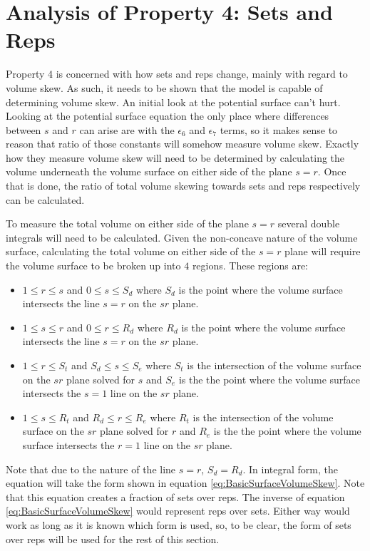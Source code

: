 \section{Analysis of Property 4: Sets and Reps}
\label{sec:PotentialSurfaceAnalysisOfProperty4}

Property 4 is concerned with how sets and reps change, mainly with regard to volume skew. As such, it needs to be shown that the model is capable of determining volume skew. An initial look at the potential surface can't hurt. Looking at the potential surface equation the only place where differences between $s$ and $r$ can arise are with the $\epsilon_6$ and $\epsilon_7$ terms, so it makes sense to reason that ratio of those constants will somehow measure volume skew. Exactly how they measure volume skew will need to be determined by calculating the volume underneath the volume surface on either side of the plane $s=r$. Once that is done, the ratio of total volume skewing towards sets and reps respectively can be calculated. 

To measure the total volume on either side of the plane $s=r$ several double integrals will need to be calculated. Given the non-concave nature of the volume surface, calculating the total volume on either side of the $s=r$ plane will require the volume surface to be broken up into $4$ regions. These regions are:

\begin{itemize}
	\item $1\le r\le s$ and $0\le s \le S_d$ where $S_d$ is the point where the volume surface intersects the line $s=r$ on the $sr$ plane.
	\item $1\le s\le r$ and $0\le r \le R_d$ where $R_d$ is the point where the volume surface intersects the line $s=r$ on the $sr$ plane.
	\item $1\le r\le S_t$ and $S_d \le s\le S_e$ where $S_t$ is the intersection of the volume surface on the $sr$ plane solved for $s$ and $S_e$ is the the point where the volume surface intersects the $s=1$ line on the $sr$ plane.
	\item $1\le s\le R_t$ and $R_d \le r\le R_e$ where $R_t$ is the intersection of the volume surface on the $sr$ plane solved for $r$ and $R_e$ is the the point where the volume surface intersects the $r=1$ line on the $sr$ plane.
\end{itemize}

Note that due to the nature of the line $s=r$, $S_d=R_d$. In integral form, the equation will take the form shown in equation \ref{eq:BasicSurfaceVolumeSkew}. Note that this equation creates a fraction of sets over reps. The inverse of equation \ref{eq:BasicSurfaceVolumeSkew} would represent reps over sets. Either way would work as long as it is known which form is used, so, to be clear, the form of sets over reps will be used for the rest of this section.

